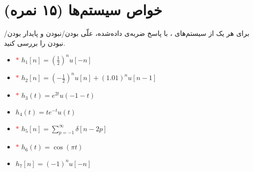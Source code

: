 \documentclass[a4paper]{article}
\begin{document}
	\newpage
	\section{
		خواص سیستم‌ها (۱۵ نمره)
	}
	برای هر یک از سیستم‌های 
	،
	با پاسخ ضربه‌ی داده‌شده،  علّی بودن/نبودن و پایدار بودن/نبودن را بررسی کنید.
	\begin{latin}
		\begin{itemize}
			\item  \textcolor{red}{$\ast$}  $h_1[n] = (\frac{1}{2})^n u[-n]$
			\item  \textcolor{red}{$\ast$}  $h_2[n] = (-\frac{1}{2})^n u[n] + (1.01)^n u[n-1]$
			\item  \textcolor{red}{$\ast$}  $h_3(t) = e^{2t} u(-1-t)$
			\item $h_4(t) = te^{-t}u(t)$
			\item  \textcolor{red}{$\ast$}  $h_5[n] = \sum_{p = -1}^{\infty} \delta[n-2p]$
			\item  \textcolor{red}{$\ast$}  $h_6(t) = \cos(\pi t)$
			\item $h_7[n] = (-1)^n u[-n]$
		\end{itemize}
	\end{latin}
	
	
\end{document}
